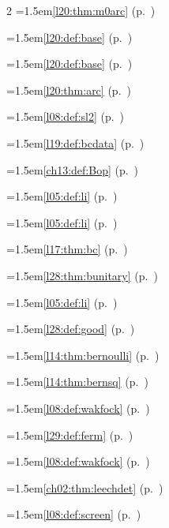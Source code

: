 \begin{multicols}{2}
\hangindent=1.5em\quad \ref{l20:thm:m0arc} (p.~\pageref{l20:thm:m0arc})\par
\hangindent=1.5em\quad \ref{l20:def:base} (p.~\pageref{l20:def:base})\par
\hangindent=1.5em\quad \ref{l20:def:base} (p.~\pageref{l20:def:base})\par
\hangindent=1.5em\quad \ref{l20:thm:arc} (p.~\pageref{l20:thm:arc})\par
\hangindent=1.5em\quad \ref{l08:def:sl2} (p.~\pageref{l08:def:sl2})\par
\hangindent=1.5em\quad \ref{l19:def:bcdata} (p.~\pageref{l19:def:bcdata})\par
\hangindent=1.5em\quad \ref{ch13:def:Bop} (p.~\pageref{ch13:def:Bop})\par
\hangindent=1.5em\quad \ref{l05:def:li} (p.~\pageref{l05:def:li})\par
\hangindent=1.5em\quad \ref{l05:def:li} (p.~\pageref{l05:def:li})\par
\hangindent=1.5em\quad \ref{l17:thm:bc} (p.~\pageref{l17:thm:bc})\par
\hangindent=1.5em\quad \ref{l28:thm:bunitary} (p.~\pageref{l28:thm:bunitary})\par
\hangindent=1.5em\quad \ref{l05:def:li} (p.~\pageref{l05:def:li})\par
\hangindent=1.5em\quad \ref{l28:def:good} (p.~\pageref{l28:def:good})\par
\hangindent=1.5em\quad \ref{l14:thm:bernoulli} (p.~\pageref{l14:thm:bernoulli})\par
\hangindent=1.5em\quad \ref{l14:thm:bernsq} (p.~\pageref{l14:thm:bernsq})\par
\hangindent=1.5em\quad \ref{l08:def:wakfock} (p.~\pageref{l08:def:wakfock})\par
\hangindent=1.5em\quad \ref{l29:def:ferm} (p.~\pageref{l29:def:ferm})\par
\hangindent=1.5em\quad \ref{l08:def:wakfock} (p.~\pageref{l08:def:wakfock})\par
\hangindent=1.5em\quad \ref{ch02:thm:leechdet} (p.~\pageref{ch02:thm:leechdet})\par
\hangindent=1.5em\quad \ref{l08:def:screen} (p.~\pageref{l08:def:screen})\par

\end{multicols}
